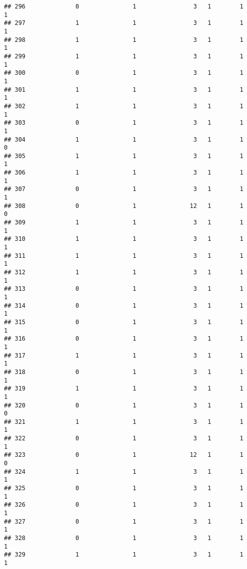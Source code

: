 \documentclass[]{article}
\begin{document}
\begin{verbatim}
## 296              0               1                3   1        1        1
## 297              1               1                3   1        1        1
## 298              1               1                3   1        1        1
## 299              1               1                3   1        1        1
## 300              0               1                3   1        1        1
## 301              1               1                3   1        1        1
## 302              1               1                3   1        1        1
## 303              0               1                3   1        1        1
## 304              1               1                3   1        1        0
## 305              1               1                3   1        1        1
## 306              1               1                3   1        1        1
## 307              0               1                3   1        1        1
## 308              0               1               12   1        1        0
## 309              1               1                3   1        1        1
## 310              1               1                3   1        1        1
## 311              1               1                3   1        1        1
## 312              1               1                3   1        1        1
## 313              0               1                3   1        1        1
## 314              0               1                3   1        1        1
## 315              0               1                3   1        1        1
## 316              0               1                3   1        1        1
## 317              1               1                3   1        1        1
## 318              0               1                3   1        1        1
## 319              1               1                3   1        1        1
## 320              0               1                3   1        1        0
## 321              1               1                3   1        1        1
## 322              0               1                3   1        1        1
## 323              0               1               12   1        1        0
## 324              1               1                3   1        1        1
## 325              0               1                3   1        1        1
## 326              0               1                3   1        1        1
## 327              0               1                3   1        1        1
## 328              0               1                3   1        1        1
## 329              1               1                3   1        1        1

\end{verbatim}
\end{document}
